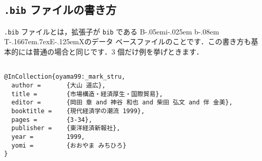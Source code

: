 \documentclass[a4j,10pt]{jarticle}
\def\BibTeX{{\rm B\kern-.05em{\sc i\kern-.025em b}\kern-.08em
    T\kern-.1667em\lower.7ex\hbox{E}\kern-.125emX}}
\begin{document}
\subsection{\texttt{.bib} ファイルの書き方}

\texttt{.bib} ファイルとは，拡張子が \texttt{bib} である \BibTeX のデータ
ベースファイルのことです．この書き方も基本的には普通の場合と同じです．3
個だけ例を挙げときます．

\begin{screen}
 \begin{verbatim}

@InCollection{oyama99:_mark_stru,
  author =       {大山 道広},
  title =        {市場構造・経済厚生・国際貿易},
  editor =       {岡田 章 and 神谷 和也 and 柴田 弘文 and 伴 金美},
  booktitle =    {現代経済学の潮流 1999},
  pages =        {3-34},
  publisher =    {東洋経済新報社},
  year =         1999,
  yomi =         {おおやま みちひろ}
}
 \end{verbatim}
\end{screen}
\end{document}
